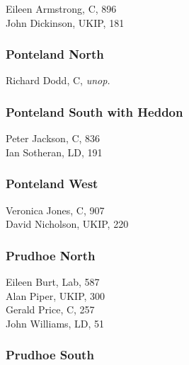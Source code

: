 \documentclass[a4paper,openany,10pt]{book}
\begin{document}
Eileen Armstrong, C, 896\\
John Dickinson, UKIP, 181\\


\subsubsection*{Ponteland North}



Richard Dodd, C, \emph{unop.}\\


\subsubsection*{Ponteland South with Heddon}



Peter Jackson, C, 836\\
Ian Sotheran, LD, 191\\


\subsubsection*{Ponteland West}



Veronica Jones, C, 907\\
David Nicholson, UKIP, 220\\


\subsubsection*{Prudhoe North}



Eileen Burt, Lab, 587\\
Alan Piper, UKIP, 300\\
Gerald Price, C, 257\\
John Williams, LD, 51\\


\subsubsection*{Prudhoe South}

\end{document}
